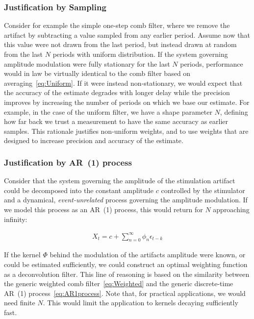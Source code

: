 \documentclass[a4paper]{article}
\begin{document}
\subsubsection{Justification by Sampling}
Consider for example the simple one-step comb filter, where we remove the artifact by subtracting a value sampled from any earlier period.
Assume now that this value were not drawn from the last period, but instead drawn at random from the last $N$ periods with uniform distribution.
If the system governing amplitude modulation were fully stationary for the last $N$ periods, performance would in law be virtually identical to the comb filter based on averaging~\eqref{eq:Uniform}.
If it were instead non-stationary, we would expect that the accuracy of the estimate degrades with longer delay while the precision improves by increasing the number of periods on which we base our estimate.
For example, in the case of the uniform filter, we have a shape parameter $N$, defining how far back we trust a measurement to have the same accuracy as earlier samples.
This rationale justifies non-uniform weights, and to use weights that are designed to increase precision and accuracy of the estimate.

\subsubsection{Justification by AR~(1) process}

Consider that the system governing the amplitude of the stimulation artifact could be decomposed into the constant amplitude $c$ controlled by the stimulator and a dynamical, \emph{event-unrelated} process governing the amplitude modulation. If we model this process as an AR~(1) process, this would return for $N$ approaching infinity:

\begin{align}
    X_{t} = c + \sum_{n=0}^{\infty} \phi_n \epsilon_{t-k}\label{eq:AR1process}
\end{align}

If the kernel $\Phi$  behind the modulation of the artifacts amplitude were known, or could be estimated sufficiently, we could construct an optimal weighting function as a deconvolution filter.
This line of reasoning is based on the similarity between the generic weighted comb filter~\eqref{eq:Weighted} and the generic discrete-time AR~(1) process~\eqref{eq:AR1process}.
Note that, for practical applications, we would need finite $N$. This would limit the application to kernels decaying sufficiently fast.
\end{document}
